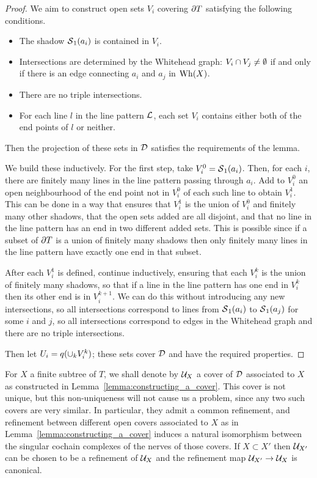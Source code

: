 \begin{proof}
We aim to construct open sets $V_i$ covering $\partial T$ satisfying the following conditions.
\begin{itemize}
  \item The shadow $\operatorname{\mathcal{S}}_1(a_i)$ is contained in $V_i$.
  \item Intersections are determined by the Whitehead graph: $V_i \cap V_j \neq \emptyset$ if and only if there is an edge connecting $a_i$ and $a_j$ in $\mathrm{Wh}(X)$.
  \item There are no triple intersections.
  \item For each line $l$ in the line pattern $\mathcal{L}$, each set $V_i$ contains either both of the end points of $l$ or neither.
\end{itemize}
Then the projection of these sets in $\mathcal{D}$ satisfies the requirements of the lemma.

We build these inductively.
For the first step, take $V_i^0 = \operatorname{\mathcal{S}}_1(a_i)$.
Then, for each $i$, there are finitely many lines in the line pattern passing through $a_i$.
Add to $V_i^0$ an open neighbourhood of the end point not in $V_i^0$ of each such line to obtain $V_i^1$.
This can be done in a way that ensures that $V_i^1$ is the union of $V_i^0$ and finitely many other shadows, that the open sets added are all disjoint, and that no line in the line pattern has an end in two different added sets.
This is possible since if a subset of $\partial T$ is a union of finitely many shadows then only finitely many lines in the line pattern have exactly one end in that subset.

After each $V_i^1$ is defined, continue inductively, ensuring that each $V_i^k$ is the union of finitely many shadows, so that if a line in the line pattern has one end in $V_i^k$ then its other end is in $V_i^{k+1}$.
We can do this without introducing any new intersections, so all intersections correspond to lines from $\operatorname{\mathcal{S}}_1(a_i)$ to $\operatorname{\mathcal{S}}_1(a_j)$ for some $i$ and $j$, so all intersections correspond to edges in the Whitehead graph and there are no triple intersections.

Then let $U_i = q(\cup_k V_i^k)$; these sets cover $\mathcal{D}$ and have the required properties.
\end{proof}

For $X$ a finite subtree of $T$, we shall denote by $\mathcal{U}_X$ a cover of $\mathcal{D}$ associated to $X$ as constructed in Lemma~\ref{lemma:constructing_a_cover}.
This cover is not unique, but this non-uniqueness will not cause us a problem, since any two such covers are very similar.
In particular, they admit a common refinement, and refinement between different open covers associated to $X$ as in Lemma~\ref{lemma:constructing_a_cover} induces a natural isomorphism between the singular cochain complexes of the nerves of those covers.
If $X \subset X'$ then $\mathcal{U}_{X'}$ can be chosen to be a refinement of $\mathcal{U}_X$ and the refinement map $\mathcal{U}_{X'} \to \mathcal{U}_X$ is canonical.

